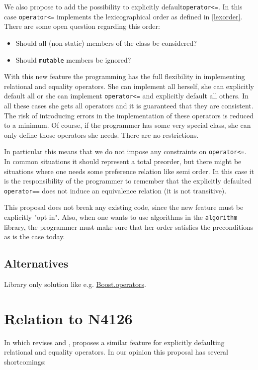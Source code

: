 ﻿\documentclass[a4paper,11pt,final]{article}
\newcommand{\tcode}[1]{\lstinline[basicstyle=\normalsize\ttfamily]{#1}}
\numberwithin{equation}{subsection}
\begin{document}
We also propose to add the possibility to explicitly default\tcode{operator<=}. In this case \tcode{operator<=} implements the lexicographical order as defined in \ref{lexorder}. There are some open question regarding this order:
\begin{itemize}
\item Should all (non-static) members of the class be considered?
\item Should \verb|mutable| members be ignored?
\end{itemize}

With this new feature the programming has the full flexibility in implementing relational and equality operators. She can implement all herself, she can explicitly default all or she can implement \tcode{operator<=} and explicitly default all others. In all these cases she gets all operators and it is guaranteed that they are consistent. The risk of introducing errors in the implementation of these operators is reduced to a minimum. Of course, if the programmer has some very special class, she can only define those operators she needs. There are no restrictions.\par

In particular this means that we do not impose any constraints on \tcode{operator<=}. In common situations it should represent a total preorder, but there might be situations where one needs some preference relation like semi order. In this case it is the responsibility of the programmer to remember that the explicitly defaulted \tcode{operator==} does not induce an equivalence relation (it is not transitive).\par

This proposal does not break any existing code, since the new feature must be explicitly "opt in". Also, when one wants to use algorithms in the \verb|algorithm| library, the programmer must make sure that her order satisfies the preconditions as is the case today.

\subsection{Alternatives}
Library only solution like e.g. \href{http://www.boost.org/doc/libs/1_56_0/libs/utility/operators.htm}{Boost.operators}.

\section{Relation to N4126}
In  which revises  and , \citeauthor{oleg3} proposes a similar feature for explicitly defaulting relational and equality operators. In our opinion this proposal has several shortcomings:
\end{document}
